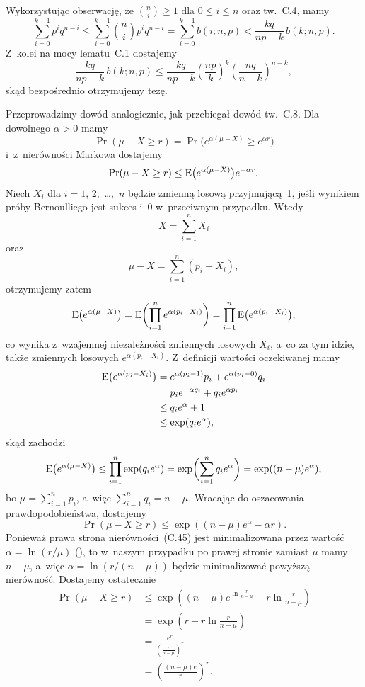 \exercise{} %
Wykorzystując obserwację, że $\binom{n}{i}\ge1$ dla $0\le i\le n$ oraz tw.~C.4, mamy
\[
	\sum_{i=0}^{k-1}p^iq^{n-i} \le \sum_{i=0}^{k-1}\binom{n}{i}p^iq^{n-i} = \sum_{i=0}^{k-1}b(i;n,p) < \frac{kq}{np-k}\,b(k;n,p).
\]
Z~kolei na mocy lematu~C.1 dostajemy
\[
	\frac{kq}{np-k}\,b(k;n,p) \le \frac{kq}{np-k}\left(\frac{np}{k}\right)^k\left(\frac{nq}{n-k}\right)^{n-k},
\]
skąd bezpośrednio otrzymujemy tezę.

\exercise{} %
Przeprowadzimy dowód analogicznie, jak przebiegał dowód tw.~C.8. Dla dowolnego $\alpha>0$ mamy
\[
	\Pr(\mu-X\ge r) = \Pr\bigl(e^{\alpha(\mu-X)}\ge e^{\alpha r}\bigr)
\]
i~z~nierówności Markowa dostajemy
\[
	\Pr(\mu-X\ge r) \le \operatorname{E}\bigl(e^{\alpha(\mu-X)}\bigr)e^{-\alpha r}.
\]
Niech $X_i$ dla $i=1$, 2,~\dots,~$n$ będzie zmienną losową przyjmującą~1, jeśli wynikiem  próby Bernoulliego jest sukces i~0 w~przeciwnym przypadku. Wtedy
\[
	X = \sum_{i=1}^nX_i
\]
oraz
\[
	\mu-X = \sum_{i=1}^n(p_i-X_i),
\]
otrzymujemy zatem
\[
	\operatorname{E}\bigl(e^{\alpha(\mu-X)}\bigr) = \operatorname{E}\biggl(\prod_{i=1}^ne^{\alpha(p_i-X_i)}\biggr) = \prod_{i=1}^n\operatorname{E}\bigl(e^{\alpha(p_i-X_i)}\bigr),
\]
co wynika z~wzajemnej niezależności zmiennych losowych $X_i$, a~co za tym idzie, także zmiennych losowych $e^{\alpha(p_i-X_i)}$. Z~definicji wartości oczekiwanej mamy
\begin{align*}
	\operatorname{E}\bigl(e^{\alpha(p_i-X_i)}\bigr) &= e^{\alpha(p_i-1)}p_i+e^{\alpha(p_i-0)}q_i \\
	&= p_ie^{-\alpha q_i}+q_ie^{\alpha p_i} \\
	&\le q_ie^{\alpha}+1 \\
	&\le \exp(q_ie^\alpha),
\end{align*}
skąd zachodzi
\[
	\operatorname{E}\bigl(e^{\alpha(\mu-X)}\bigr) \le \prod_{i=1}^n\exp(q_ie^\alpha) = \exp\biggl(\sum_{i=1}^nq_ie^\alpha\biggr) = \exp((n-\mu)e^\alpha),
\]
bo $\mu=\sum_{i=1}^np_i$, a~więc $\sum_{i=1}^nq_i=n-\mu$. Wracając do oszacowania prawdopodobieństwa, dostajemy
\[
	\Pr(\mu-X\ge r) \le \exp((n-\mu)e^\alpha-\alpha r).
\]
Ponieważ prawa strona nierówności~(C.45) jest minimalizowana przez wartość $\alpha=\ln(r/\mu)$ (), to w~naszym przypadku po prawej stronie zamiast $\mu$ mamy $n-\mu$, a~więc $\alpha=\ln(r/(n-\mu))$ będzie minimalizować powyższą nierówność. Dostajemy ostatecznie
\begin{align*}
	\Pr(\mu-X\ge r) &\le \exp\left((n-\mu)e^{\ln\frac{r}{n-\mu}}-r\ln\frac{r}{n-\mu}\right) \\
	&= \exp\left(r-r\ln\frac{r}{n-\mu}\right) \\
	&= \frac{e^r}{\left(\frac{r}{n-\mu}\right)^r} \\
	&= \left(\frac{(n-\mu)e}{r}\right)^r.
\end{align*}

